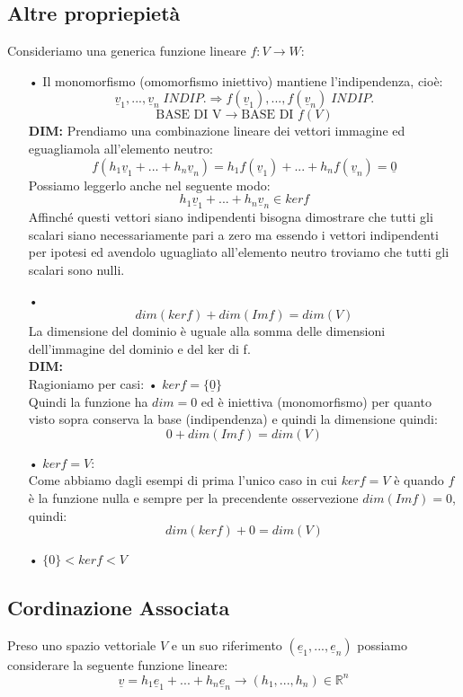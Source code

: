 \subsection{Altre propriepietà}
Consideriamo una generica funzione lineare $f: V \rightarrow W$:
\begin{itemize}
\item[•] Il monomorfismo (omomorfismo iniettivo) mantiene l'indipendenza, cioè:
$$  \underline{v}_1,...,\underline{v}_n \; INDIP. \Rightarrow f(\underline{v}_1),...,f(\underline{v}_n) \; INDIP.$$
$$ \text{BASE DI V} \rightarrow \text{BASE DI }f(V) $$
\textbf{DIM:}
Prendiamo una combinazione lineare dei vettori immagine ed eguagliamola all’elemento
neutro:
$$ f(h_1\underline{v}_1+...+h_n\underline{v}_n) = h_1f(\underline{v}_1)+...+h_nf(\underline{v}_n) = \underline{0}   $$
Possiamo leggerlo anche nel seguente modo:
$$ h_1\underline{v}_1+...+h_n\underline{v}_n \in ker f $$
Affinché questi vettori siano indipendenti bisogna dimostrare che tutti gli scalari siano necessariamente pari a zero ma essendo i vettori indipendenti per ipotesi ed avendolo uguagliato all'elemento neutro troviamo che tutti gli scalari sono nulli.

\item[•] $$ dim(ker f) + dim(Im f) = dim (V) $$ 
La dimensione del dominio è uguale alla somma delle dimensioni dell'immagine del dominio e del ker di f.\\
\textbf{DIM:}\\
Ragioniamo per casi:
\subitem • $ker f = \{\underline{0}\}$\\
Quindi la funzione ha $dim=0$ ed è iniettiva (monomorfismo) per quanto visto sopra conserva la base (indipendenza) e quindi la dimensione quindi:
$$ 0 + dim(Im f) = dim (V) $$

\subitem • $ker f = V$:\\
Come abbiamo dagli esempi di prima l'unico caso in cui $ker f = V$ è quando $f$ è la funzione nulla e sempre per la precendente osservezione $dim (Im f) = 0$, quindi:
$$ dim (ker f) + 0 = dim (V) $$

\subitem • $\{0\} < ker f < V$\\
\blindtext

\end{itemize}


\subsection{Cordinazione Associata}
Preso uno spazio vettoriale $V$ e un suo riferimento $(\underline{e}_1,...,\underline{e}_n)$ possiamo considerare la seguente funzione lineare:
$$ \underline{v} = h_1\underline{e}_1+...+h_n\underline{e}_n \rightarrow (h_1,...,h_n) \in \mathbb{R}^n $$



